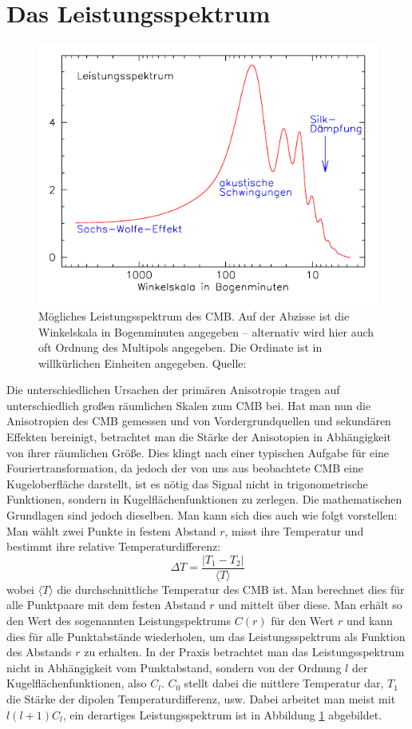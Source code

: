 \documentclass[10pt,a4paper]{article}
\begin{document}
\section{Das Leistungsspektrum}
\begin{figure}
\center
\includegraphics[scale=1]{pow}
\caption{Mögliches Leistungsspektrum des CMB. Auf der Abzisse ist die Winkelskala in Bogenminuten angegeben -- alternativ wird hier auch oft Ordnung des Multipols angegeben. Die Ordinate ist in willkürlichen Einheiten angegeben. Quelle: \cite{A+R}}
\label{pow}
\end{figure}
Die unterschiedlichen Ursachen der primären Anisotropie tragen auf unterschiedlich großen räumlichen Skalen zum CMB bei.
Hat man nun die Anisotropien des CMB gemessen und von Vordergrundquellen und sekundären Effekten bereinigt, betrachtet man die Stärke der Anisotopien in Abhängigkeit von ihrer räumlichen Größe.
Dies klingt nach einer typischen Aufgabe für eine Fouriertransformation, da jedoch der von uns aus beobachtete CMB eine Kugeloberfläche darstellt, ist es nötig das Signal nicht in trigonometrische Funktionen, sondern in Kugelflächenfunktionen zu zerlegen. Die mathematischen Grundlagen sind jedoch dieselben. 
Man kann sich dies auch wie folgt vorstellen:
Man wählt zwei Punkte in festem Abstand $r$, misst ihre Temperatur und bestimmt ihre relative Temperaturdifferenz:
\begin{equation}
\Delta T = \frac{|T_1-T_2|}{\langle T\rangle }
\end{equation}
wobei $\langle T\rangle$ die durchschnittliche Temperatur des CMB ist. Man berechnet dies für alle Punktpaare mit dem festen Abstand $r$ und mittelt über diese. Man erhält so den Wert des sogenannten Leistungspektrums $C(r)$ für den Wert $r$ und kann dies für alle Punktabstände wiederholen, um das Leistungsspektrum als Funktion des Abstands $r$ zu erhalten. In der Praxis betrachtet man das Leistungsspektrum nicht in Abhängigkeit vom Punktabstand, sondern von der Ordnung $l$ der Kugelflächenfunktionen, also $C_l$. $C_0$ stellt dabei die mittlere Temperatur dar, $T_1$ die Stärke der dipolen Temperaturdifferenz, usw.
Dabei arbeitet man meist mit $l\left(l+1\right)C_l$, ein derartiges Leistungsspektrum ist in Abbildung \ref{pow} abgebildet.
\end{document}
